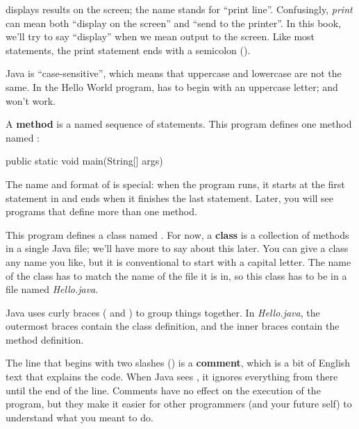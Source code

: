 
 displays results on the screen; the name  stands for ``print line''.
Confusingly, {\em print} can mean both ``display on the screen'' and ``send to the printer''.
In this book, we'll try to say ``display'' when we mean output to the screen.
Like most statements, the print statement ends with a semicolon (\java{;}).


Java is ``case-sensitive'', which means that uppercase and lowercase are not the same.
In the Hello World program,  has to begin with an uppercase letter;  and  won't work.


A {\bf method} is a named sequence of statements.
This program defines one method named :

\begin{code}
public static void main(String[] args)
\end{code}


The name and format of  is special: when the program runs, it starts at the first statement in  and ends when it finishes the last statement.
Later, you will see programs that define more than one method.


This program defines a class named .
For now, a {\bf class} is a collection of methods in a single Java file; we'll have more to say about this later.
You can give a class any name you like, but it is conventional to start with a capital letter.
The name of the class has to match the name of the file it is in, so this class has to be in a file named {\it Hello.java}.


Java uses curly braces (\java{\{} and \java{\}}) to group things together.
In {\it Hello.java}, the outermost braces contain the class definition, and the inner braces contain the method definition.


The line that begins with two slashes (\java{//}) is a {\bf comment}, which is a bit of English text that explains the code.
When Java sees \java{//}, it ignores everything from there until the end of the line.
Comments have no effect on the execution of the program, but they make it easier for other programmers (and your future self) to understand what you meant to do.


